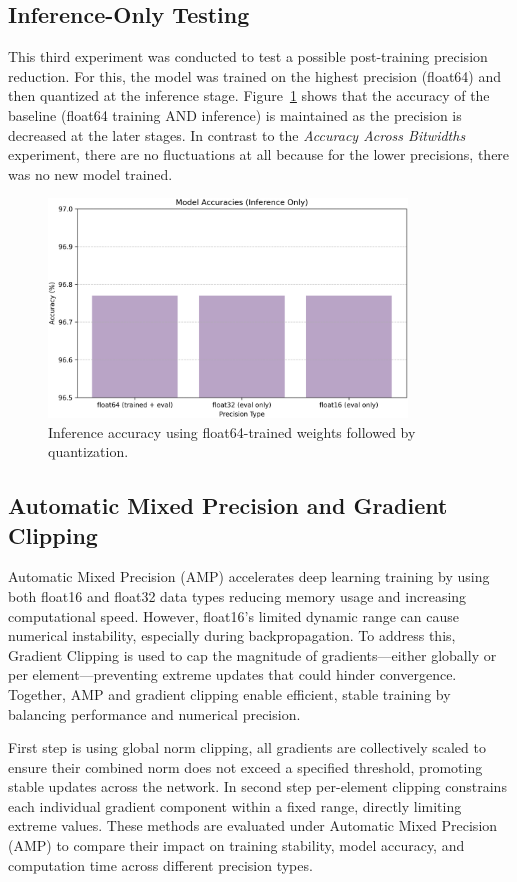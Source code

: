 \documentclass[11pt]{article}
\begin{document}
\subsection*{Inference-Only Testing}
This third experiment was conducted to test a possible post-training precision
reduction. For this, the model was trained on the highest precision (float64)
and then quantized at the inference stage.
Figure~\ref{fig:inferenceOnlyTesting} shows that the accuracy of the baseline
(float64 training AND inference) is maintained as the precision is decreased at
the later stages. In contrast to the \textit{Accuracy Across Bitwidths}
experiment, there are no fluctuations at all because for the lower precisions,
there was no new model trained.
\begin{figure}[H]
	\centering
	\includegraphics[width=0.85\textwidth]{figures/inferenceOnly.png}
	\caption{Inference accuracy using float64-trained weights followed by quantization.}\label{fig:inferenceOnlyTesting}
\end{figure}

\subsection*{Automatic Mixed Precision and Gradient Clipping}
Automatic Mixed Precision (AMP) accelerates deep learning training by using
both float16 and float32 data types reducing memory usage and increasing
computational speed. However, float16’s limited dynamic range can cause
numerical instability, especially during backpropagation. To address this,
Gradient Clipping is used to cap the magnitude of gradients—either globally or
per element—preventing extreme updates that could hinder convergence. Together,
AMP and gradient clipping enable efficient, stable training by balancing
performance and numerical precision.

First step is using global norm clipping, all gradients are collectively scaled
to ensure their combined norm does not exceed a specified threshold, promoting
stable updates across the network. In second step per-element clipping
constrains each individual gradient component within a fixed range, directly
limiting extreme values. These methods are evaluated under Automatic Mixed
Precision (AMP) to compare their impact on training stability, model accuracy,
and computation time across different precision types.
\end{document}
